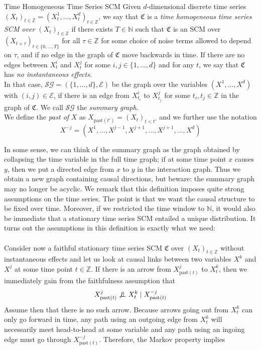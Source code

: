 \documentclass[11pt, a4paper]{memoir}
\theoremstyle{break}
\theoremstyle{break}
\theoremstyle{nonumberplain}
\newcommand{\mN}{\mathbb{N}}
\newcommand{\mZ}{\mathbb{Z}}
\newcommand{\indep}{\perp \!\!\! \perp}
\begin{document}
\begin{mydefinition}{Time Homogeneous Time Series SCM}
Given $d$-dimensional discrete time series $(X_t)_{t\in \mZ}=(X_t^1,\ldots,X_t^d)_{t\in \mZ}$, we say that $\mathfrak{C}$ is a \emph{time homogeneous time series SCM over $(X_t)_{t\in \mZ}$} if there exists $T\in \mN$ such that $\mathfrak{C}$ is an SCM over $(X_{t+\tau})_{t\in \{0,\ldots,T\}}$ for all $\tau\in \mZ$ for some choice of noise terms allowed to depend on $\tau$, and if no edge in the graph of $\mathfrak{C}$ move backwards in time. If there are no edges between $X^i_t$ and $X^j_t$ for some $i,j\in \{1,\ldots,d\}$ and for any $t$, we say that $\mathfrak{C}$ has \emph{no instantaneous effects}.\\[5pt]
In that case, $\mathcal{SG}=(\{1,\ldots,d\},\mathcal{E})$ be the graph over the variables $(X^1,\ldots,X^d)$ with $(i,j)\in \mathcal{E}$, if there is an edge from $X_{t_i}^i$ to $X_{t_j}^j$ for some $t_i,t_j\in \mZ$ in the graph of $\mathfrak{C}$. We call $\mathcal{SG}$ the \emph{summary graph}.\\[5pt]
We define the \emph{past of} $X$ as $X_{\text{past}(t')}=(X_t)_{t<t'}$ and we further use the notation $$X^{-j}=(X^1,\ldots,X^{j-1},X^{j+1},\ldots, X^{j+1},\ldots,X^d)$$
\end{mydefinition}
\noindent In some sense, we can think of the summary graph as the graph obtained by collapsing the time variable in the full time graph; if at some time point $x$ causes $y$, then we put a directed edge from $x$ to $y$ in the interaction graph. Thus we obtain a new graph containing causal directions, but beware: the summary graph may no longer be acyclic. We remark that this definition imposes quite strong assumptions on the time series. The point is that we want the causal structure to be fixed over time. Moreover, if we restricted the time window to $\mN$, it would also be immediate that a stationary time series SCM entailed a unique distribution. It turns out the assumptions in this definition is exactly what we need:\\\\
Consider now a faithful stationary time series SCM $\mathfrak{C}$ over $(X_t)_{t\in \mZ}$ without instantaneous effects and let us look at causal links between two variables $X^k$ and $X^j$ at some time point $t\in \mZ$. If there is an arrow from $X_{\text{past}(t)}^j$ to $X_t^k$, then we immediately gain from the faithfulness assumption that
$$X^j_{\text{past}(t)}\centernot\indep X_t^k\mid X^{-j}_{\text{past}(t)}$$
Assume then that there is no such arrow. Because arrows going out from $X_t^k$ can only go forward in time, any path using an outgoing edge from $X_t^k$ will necessarily meet head-to-head at some variable and any path using an ingoing edge must go through $X^{-j}_{\text{past}(t)}$. Therefore, the Markov property implies 
\end{document}
